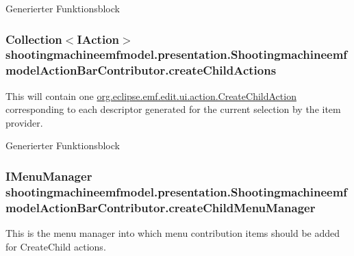 Generierter Funktionsblock \hypertarget{classshootingmachineemfmodel_1_1presentation_1_1_shootingmachineemfmodel_action_bar_contributor_a20d4d7f73085c23ce49651155d8ad82e}{
\subsubsection[{create\-Child\-Actions}]{\setlength{\rightskip}{0pt plus 5cm}Collection$<$I\-Action$>$ shootingmachineemfmodel.\-presentation.\-Shootingmachineemfmodel\-Action\-Bar\-Contributor.\-create\-Child\-Actions\hspace{0.3cm}{\ttfamily [protected]}}}\label{classshootingmachineemfmodel_1_1presentation_1_1_shootingmachineemfmodel_action_bar_contributor_a20d4d7f73085c23ce49651155d8ad82e}
This will contain one \hyperlink{}{org.\-eclipse.\-emf.\-edit.\-ui.\-action.\-Create\-Child\-Action} corresponding to each descriptor generated for the current selection by the item provider.

Generierter Funktionsblock \hypertarget{classshootingmachineemfmodel_1_1presentation_1_1_shootingmachineemfmodel_action_bar_contributor_a0bd99b1414919a6ef97962b8ef4218a9}{
\subsubsection[{create\-Child\-Menu\-Manager}]{\setlength{\rightskip}{0pt plus 5cm}I\-Menu\-Manager shootingmachineemfmodel.\-presentation.\-Shootingmachineemfmodel\-Action\-Bar\-Contributor.\-create\-Child\-Menu\-Manager\hspace{0.3cm}{\ttfamily [protected]}}}\label{classshootingmachineemfmodel_1_1presentation_1_1_shootingmachineemfmodel_action_bar_contributor_a0bd99b1414919a6ef97962b8ef4218a9}
This is the menu manager into which menu contribution items should be added for Create\-Child actions.

